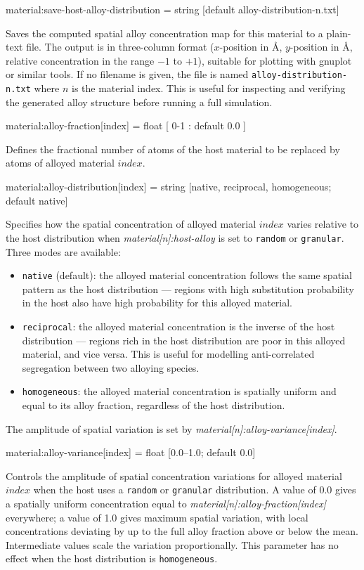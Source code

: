 {\zicf material:save-host-alloy-distribution = string [default alloy-distribution-n.txt]} Saves the computed spatial alloy concentration map for this material to a plain-text file. The output is in three-column format ($x$-position in \AA, $y$-position in \AA, relative concentration in the range $-1$ to $+1$), suitable for plotting with gnuplot or similar tools. If no filename is given, the file is named \texttt{alloy-distribution-n.txt} where $n$ is the material index. This is useful for inspecting and verifying the generated alloy structure before running a full simulation.

{\zicf material:alloy-fraction[index] = float [ 0-1 : default 0.0 ]} Defines the fractional number of atoms of the host material to be replaced by atoms of alloyed material $index$.

{\zicf material:alloy-distribution[index] = string [native, reciprocal, homogeneous; default native]} Specifies how the spatial concentration of alloyed material $index$ varies relative to the host distribution when \textit{material[n]:host-alloy} is set to \texttt{random} or \texttt{granular}. Three modes are available:
\begin{itemize}
  \item[] \texttt{native} (default): the alloyed material concentration follows the same spatial pattern as the host distribution --- regions with high substitution probability in the host also have high probability for this alloyed material.
  \item[] \texttt{reciprocal}: the alloyed material concentration is the inverse of the host distribution --- regions rich in the host distribution are poor in this alloyed material, and vice versa. This is useful for modelling anti-correlated segregation between two alloying species.
  \item[] \texttt{homogeneous}: the alloyed material concentration is spatially uniform and equal to its alloy fraction, regardless of the host distribution.
\end{itemize}
The amplitude of spatial variation is set by \textit{material[n]:alloy-variance[index]}.

{\zicf material:alloy-variance[index] = float [0.0--1.0; default 0.0]} Controls the amplitude of spatial concentration variations for alloyed material $index$ when the host uses a \texttt{random} or \texttt{granular} distribution. A value of 0.0 gives a spatially uniform concentration equal to \textit{material[n]:alloy-fraction[index]} everywhere; a value of 1.0 gives maximum spatial variation, with local concentrations deviating by up to the full alloy fraction above or below the mean. Intermediate values scale the variation proportionally. This parameter has no effect when the host distribution is \texttt{homogeneous}.

